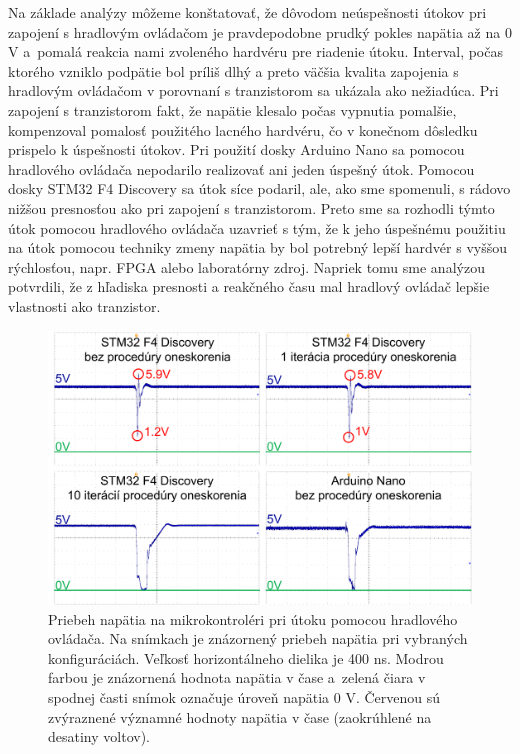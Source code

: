 Na základe analýzy môžeme konštatovať, že dôvodom neúspešnosti útokov pri zapojení s hradlovým ovládačom je pravdepodobne prudký pokles napätia až na 0 V a~pomalá reakcia nami zvoleného hardvéru pre riadenie útoku. Interval, počas ktorého vzniklo podpätie bol príliš dlhý a preto väčšia kvalita zapojenia s hradlovým ovládačom v porovnaní s tranzistorom sa ukázala ako nežiadúca. Pri zapojení s tranzistorom fakt, že napätie klesalo počas vypnutia pomalšie, kompenzoval pomalosť použitého lacného hardvéru, čo v konečnom dôsledku prispelo k úspešnosti útokov. Pri použití dosky Arduino Nano sa pomocou hradlového ovládača nepodarilo realizovať ani jeden úspešný útok. Pomocou dosky STM32 F4 Discovery sa útok síce podaril, ale, ako sme spomenuli, s rádovo nižšou presnosťou ako pri zapojení s tranzistorom. Preto sme sa rozhodli týmto útok pomocou hradlového ovládača uzavrieť s tým, že k jeho úspešnému použitiu na útok pomocou techniky zmeny napätia by bol potrebný lepší hardvér s vyššou rýchlosťou, napr. FPGA alebo laboratórny zdroj. Napriek tomu sme analýzou potvrdili, že z hľadiska presnosti a reakčného času mal hradlový ovládač lepšie vlastnosti ako tranzistor.

\begin{figure}
    \centerline{\includegraphics[width=1\textwidth]{images/gateDriverAnalysis.png}}
    \caption[Priebeh napätia na mikrokontroléri pri útoku hradlovým ovládačom]{Priebeh napätia na mikrokontroléri pri útoku pomocou hradlového ovládača. Na snímkach je znázornený priebeh napätia pri vybraných konfiguráciách. Veľkosť horizontálneho dielika je 400 ns. Modrou farbou je znázornená hodnota napätia v čase a~zelená čiara v spodnej časti snímok označuje úroveň napätia 0 V. Červenou sú zvýraznené významné hodnoty napätia v čase (zaokrúhlené na desatiny voltov).}
    \label{obr:gateDriverAnalysis}
\end{figure}